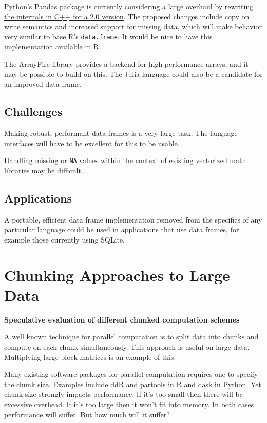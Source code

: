 \documentclass[12pt]{article}
\begin{document}
Python's Pandas package is currently considering a large overhaul by
\href{https://pandas-dev.github.io/pandas2/internal-architecture.html#building-libpandas-in-c-11-14-for-lowest-level-implementation-tier}{rewriting
the internals in C++ for a 2.0 version}. The proposed changes include
copy on write semantics and increased support for missing data, which will
make behavior very similar to base R's \texttt{data.frame}.
It would be nice to have this implementation available in R.

The ArrayFire library provides a backend for high performance arrays, and
it may be possible to build on this.
The Julia language could also be a candidate for an improved data frame.

\subsection{Challenges}

Making robust, performant data frames is a very large task. The language
interfaces will have to be excellent for this to be usable.

Handling missing or \texttt{NA} values within the context of existing
vectorized math libraries may be difficult.

\subsection{Applications}

A portable, efficient data frame implementation removed from the specifics
of any particular language could be used in applications that use
data frames, for example those currently using SQLite.

\section{Chunking Approaches to Large Data}

\textbf{Speculative evaluation of different chunked computation schemes}

A well known technique for parallel computation is to split data into
chunks and compute on each chunk simultaneously. This approach 
is useful on large data. Multiplying large block matrices is an example of this.

Many existing software packages for parallel computation requires one to specify the
chunk size. Examples include ddR \cite{R-ddR} and partools
\cite{R-partools} in R and dask in Python.
Yet chunk size strongly impacts
performance. If it's too small then there will be excessive overhead. If
it's too large then it won't fit into memory. In both cases performance
will suffer. But how much will it suffer?
\end{document}
